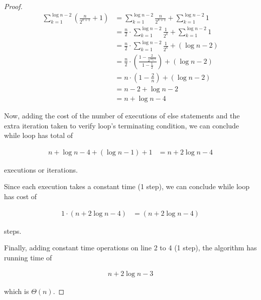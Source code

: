 \documentclass[12pt]{article}
\begin{document}
\begin{enumerate}[a.]
\begin{proof}
        \begin{align}
            \sum\limits_{k=1}^{\log n - 2} \left( \frac{n}{2^{k+1}} + 1 \right) &= \sum\limits_{k=1}^{\log n - 2} \frac{n}{2^{k+1}} + \sum\limits_{k=1}^{\log n - 2} 1\\
            &= \frac{n}{2} \cdot \sum\limits_{k=1}^{\log n - 2} \frac{1}{2^{k}} + \sum\limits_{k=1}^{\log n - 2} 1\\
            &= \frac{n}{2} \cdot \sum\limits_{k=1}^{\log n - 2} \frac{1}{2^{k}} + (\log n - 2)\\
            &= \frac{n}{2} \cdot \left( \frac{1 - \frac{2}{2^{\log n}}}{1 - \frac{1}{2}} \right) + (\log n - 2)\\
            &= n \cdot \left( 1 - \frac{2}{n} \right) + (\log n - 2)\\
            &= n - 2 + \log n - 2\\
            &= n + \log n - 4
        \end{align}

        \bigskip

        Now, adding the cost of the number of executions of else statements and
        the extra iteration taken to verify loop's terminating condition, we can
        conclude while loop has total of

        \begin{align}
            n + \log n - 4 + (\log n - 1) + 1 &= n + 2\log n - 4
        \end{align}

        executions or iterations.

        \bigskip

        Since each execution takes a constant time (1 step), we can conclude
        while loop has cost of

        \begin{align}
            1 \cdot (n + 2\log n - 4) &= (n + 2\log n - 4)
        \end{align}

        steps.

        \bigskip

        Finally, adding constant time operations on line 2 to 4 (1 step), the
        algorithm has running time of

        \begin{align}
            n + 2\log n - 3
        \end{align}

        which is $\Theta(n)$.


\end{proof}
\end{enumerate}
\end{document}
